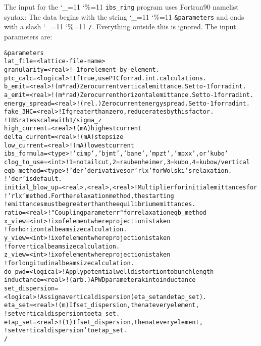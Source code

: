 \documentclass[11pt]{article}
\newcommand\ttcmd{\begingroup\catcode`\_=11 \catcode`\%=11 \dottcmd}
\newcommand\dottcmd[1]{\texttt{#1}\endgroup}
\newcommand{\vn}{\ttcmd}
\newlength{\ExBeg}
\newlength{\ExEnd}
\newenvironment{example}
  {\vspace{\ExBeg} \begin{alltt}}
  {\end{alltt} \vspace{\ExEnd}}
\begin{document}
The input for the \vn{ibs_ring} program uses Fortran90 namelist
syntax: The data begins with the string \vn{\&parameters} and ends
with a slash \vn{/}. Everything outside this is ignored.
The input parameters are:
\begin{example}
\&parameters
  lat_file = <lattice-file-name>
  granularity = <real>   ! -1 for element-by-element.
  ptc_calc = <logical>  ! If true, use PTC for rad. int. calculations.
  b_emit = <real>  ! (m*rad) Zero current vertical emittance.  Set to -1 for rad int.
  a_emit = <real>  ! (m*rad) Zero current horizontal emittance.  Set to -1 for rad int.
  energy_spread = <real>  ! (rel.) Zero current energy spread.  Set to -1 for rad int.
  fake_3HC = <real> ! If greater than zero, reduce rates by this factor.  
                    ! IBS rates scale with 1/sigma_z
  high_current = <real>  ! (mA) highest current
  delta_current = <real> ! (mA) step size
  low_current = <real>   ! (mA) lowest current
  ibs_formula = <type>  ! 'cimp', 'bjmt', 'bane', 'mpzt', 'mpxx', or 'kubo'
  clog_to_use = <int>   ! 1=no tail cut, 2=raubenheimer, 3=kubo, 4=kubo w/vertical
  eqb_method = <type>   ! 'der' derivatives or 'rlx' for Wolski's relaxation.  
                        ! 'der' is default.
  initial_blow_up = <real>, <real>, <real> ! Multiplier for initial emittances for 
                  ! 'rlx' method.  For the relaxation method, the starting 
                  ! emittances must be greater than the equilibrium emittances.
  ratio = <real>  ! "Coupling parameter r" for relaxation eqb_method
  x_view = <int>  ! ix of element where projection is taken 
                  ! for horizontal beam size calculation.
  y_view = <int>  ! ix of element where projection is taken 
                  ! for vertical beam size calculation.
  z_view = <int>  ! ix of element where projection is taken 
                  ! for longitudinal beam size calculation.
  do_pwd = <logical>  ! Apply potential well distortion to bunch length
  inductance = <real>  ! (arb.) A PWD parameter akin to inductance
  set_dispersion = <logical> ! Assign a vertical dispersion (eta_set and etap_set).
  eta_set = <real> ! (m) If set_dispersion, then at every element, 
                   ! set vertical dispersion to eta_set.
  etap_set = <real> ! (1) If set_dispersion, then at every element, 
                    ! set vertical dispersion' to etap_set.
/
\end{example}
\end{document}
